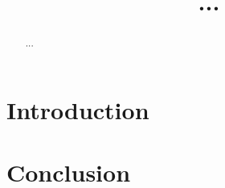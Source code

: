 \documentclass[submission]{iacrtrans}
\title{...}
\author{}
\institute{}
\author{}
\institute{}
\begin{document}

\maketitle

\begin{abstract}
...
\end{abstract}


\tableofcontents

\section{Introduction}
\label{sec:intro}



\section{Conclusion}
\label{sec:outro}






\end{document}
